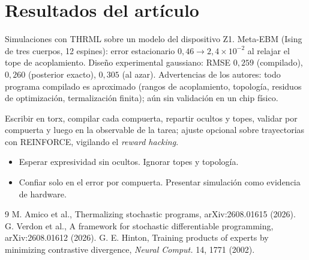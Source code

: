 \documentclass[11pt,a4paper]{article}
\begin{document}
\section{Resultados del artículo \evP}
Simulaciones con THRML sobre un modelo del dispositivo Z1. Meta-EBM (Ising de tres cuerpos, 12 espines): error estacionario $0{,}46\to2{,}4\times10^{-2}$ al relajar el tope
de acoplamiento. Diseño experimental gaussiano: RMSE $0{,}259$ (compilado), $0{,}260$ (posterior exacto), $0{,}305$ (al azar). Advertencias de los autores: todo programa
compilado es aproximado (rangos de acoplamiento, topología, residuos de optimización, termalización finita); aún sin validación en un chip físico.

\begin{aplicacion}
Escribir en torx, compilar cada compuerta, repartir ocultos y topes, validar por compuerta y luego en la observable de la tarea; ajuste opcional sobre trayectorias con
REINFORCE, vigilando el \emph{reward hacking}.
\end{aplicacion}

\begin{error}
\begin{itemize}[nosep]
\item Esperar expresividad sin ocultos. \quad Ignorar topes y topología.
\item Confiar solo en el error por compuerta. \quad Presentar simulación como evidencia de hardware.
\end{itemize}
\end{error}

\begin{thebibliography}{9}\small
{} M. Amico et al., Thermalizing stochastic programs, arXiv:2608.01615 (2026).
 G. Verdon et al., A framework for stochastic differentiable programming, arXiv:2608.01612 (2026).
 G. E. Hinton, Training products of experts by minimizing contrastive divergence, \emph{Neural Comput.} 14, 1771 (2002).
\end{thebibliography}
\end{document}
